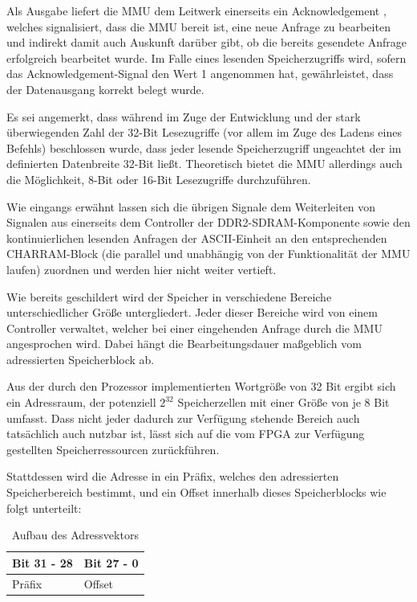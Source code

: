 Als Ausgabe liefert die MMU dem Leitwerk einerseits ein Acknowledgement , welches signalisiert, dass die MMU bereit ist, eine neue Anfrage zu bearbeiten und indirekt damit auch Auskunft dar\"uber gibt, ob die bereits gesendete Anfrage erfolgreich bearbeitet wurde. Im Falle eines lesenden Speicherzugriffs wird, sofern das Acknowledgement-Signal den Wert 1 angenommen hat, gew\"ahrleistet, dass der Datenausgang  korrekt belegt wurde.

Es sei angemerkt, dass w\"ahrend im Zuge der Entwicklung und der stark \"uberwiegenden Zahl der 32-Bit Lesezugriffe (vor allem im Zuge des Ladens eines Befehls) beschlossen wurde, dass jeder lesende Speicherzugriff ungeachtet der im  definierten Datenbreite 32-Bit lie\ss{}t. Theoretisch bietet die MMU allerdings auch die M\"oglichkeit, 8-Bit oder 16-Bit Lesezugriffe durchzuf\"uhren.


Wie eingangs erw\"ahnt lassen sich die \"ubrigen Signale dem Weiterleiten von Signalen aus einerseits dem Controller der DDR2-SDRAM-Komponente sowie den kontinuierlichen lesenden Anfragen der ASCII-Einheit an den entsprechenden CHARRAM-Block (die parallel und unabh\"angig von der Funktionalit\"at der MMU laufen) zuordnen und werden hier nicht weiter vertieft.


Wie bereits geschildert wird der Speicher in verschiedene Bereiche unterschiedlicher Gr\"o\ss{}e untergliedert. Jeder dieser Bereiche wird von einem Controller verwaltet, welcher bei einer eingehenden Anfrage durch die MMU angesprochen wird. Dabei h\"angt die Bearbeitungsdauer ma\ss{}geblich vom adressierten Speicherblock ab.

Aus der durch den Prozessor implementierten Wortgr\"o\ss{}e von 32 Bit ergibt sich ein Adressraum, der potenziell $2^{32}$ Speicherzellen mit einer Gr\"o\ss{}e von je 8 Bit umfasst. Dass nicht jeder dadurch zur Verf\"ugung stehende Bereich auch tats\"achlich auch nutzbar ist, l\"asst sich auf die vom FPGA zur Verf\"ugung gestellten Speicherressourcen zur\"uckf\"uhren.

Stattdessen wird die Adresse in ein Pr\"afix, welches den adressierten Speicherbereich bestimmt, und ein Offset innerhalb dieses Speicherblocks wie folgt unterteilt:

\begin{table}[H]
\begin{center}
	\begin{tabular}{| l | l |}
		\hline
		Bit 31 - 28 & Bit 27 - 0 \\ \hline
		Pr\"afix & Offset \\ \hline
	\end{tabular}
\end{center}
\caption{Aufbau des Adressvektors}
\end{table}

